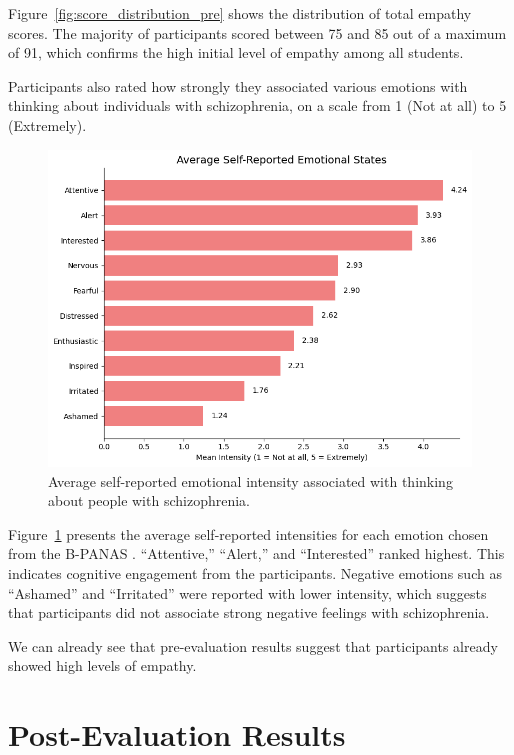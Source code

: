\vspace{1em}

Figure~\ref{fig:score_distribution_pre} shows the distribution of total empathy scores. The majority of participants scored between 75 and 85 out of a maximum of 91, which confirms the high initial level of empathy among all students.

\vspace{1em}

Participants also rated how strongly they associated various emotions with thinking about individuals with schizophrenia, on a scale from 1 (Not at all) to 5 (Extremely).

\begin{figure}[htbp]
    \centering
    \includegraphics[width=0.7\columnwidth]{../../Figures/avg-emotions-pre.png}
    \caption{Average self-reported emotional intensity associated with thinking about people with schizophrenia.}
    \label{fig:avg_emotions_pre}
\end{figure}

Figure~\ref{fig:avg_emotions_pre} presents the average self-reported intensities for each emotion chosen from the B-PANAS \cite{Boiroux2024}. “Attentive,” “Alert,” and “Interested” ranked highest. This indicates cognitive engagement from the participants. Negative emotions such as “Ashamed” and “Irritated” were reported with lower intensity, which suggests that participants did not associate strong negative feelings with schizophrenia. 

\vspace{1em}

We can already see that pre-evaluation results suggest that participants already showed high levels of empathy. 

\section{Post-Evaluation Results}

